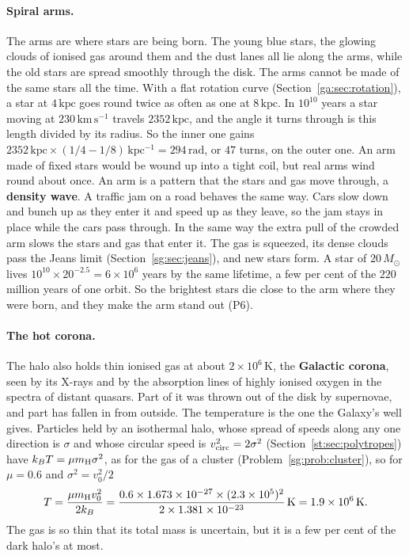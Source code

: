 \paragraph{Spiral arms.} The arms are where stars are being born. The young blue stars, the glowing clouds of ionised gas around them and the dust lanes all lie along the arms, while the old stars are spread smoothly through the disk. The arms cannot be made of the same stars all the time. With a flat rotation curve (Section~\ref{ga:sec:rotation}), a star at $4\,\mathrm{kpc}$ goes round twice as often as one at $8\,\mathrm{kpc}$. In $10^{10}$ years a star moving at $230\,\mathrm{km\,s^{-1}}$ travels $2352\,\mathrm{kpc}$, and the angle it turns through is this length divided by its radius. So the inner one gains $2352\,\mathrm{kpc}\times(1/4-1/8)\,\mathrm{kpc^{-1}}=294\,\mathrm{rad}$, or $47$ turns, on the outer one. An arm made of fixed stars would be wound up into a tight coil, but real arms wind round about once. An arm is a pattern that the stars and gas move through, a \textbf{density wave}. A traffic jam on a road behaves the same way. Cars slow down and bunch up as they enter it and speed up as they leave, so the jam stays in place while the cars pass through. In the same way the extra pull of the crowded arm slows the stars and gas that enter it. The gas is squeezed, its dense clouds pass the Jeans limit (Section~\ref{sg:sec:jeans}), and new stars form. A star of $20\,M_\odot$ lives $10^{10}\times20^{-2.5}=6\times10^6$ years by the same lifetime, a few per cent of the $220$ million years of one orbit. So the brightest stars die close to the arm where they were born, and they make the arm stand out (P6).

\paragraph{The hot corona.} The halo also holds thin ionised gas at about $2\times10^6\,\mathrm K$, the \textbf{Galactic corona}, seen by its X-rays and by the absorption lines of highly ionised oxygen in the spectra of distant quasars. Part of it was thrown out of the disk by supernovae, and part has fallen in from outside. The temperature is the one the Galaxy's well gives. Particles held by an isothermal halo, whose spread of speeds along any one direction is $\sigma$ and whose circular speed is $v_{\rm circ}^2=2\sigma^2$ (Section~\ref{st:sec:polytropes}) have $k_BT=\mu m_{\rm H}\sigma^2$, as for the gas of a cluster (Problem~\ref{sg:prob:cluster}), so for $\mu=0.6$ and $\sigma^2=v_0^2/2$
\[
T=\frac{\mu m_{\rm H}v_0^2}{2k_B}=\frac{0.6\times1.673\times10^{-27}\times(2.3\times10^5)^2}{2\times1.381\times10^{-23}}\,\mathrm K=1.9\times10^6\,\mathrm K .
\]
The gas is so thin that its total mass is uncertain, but it is a few per cent of the dark halo's at most.

